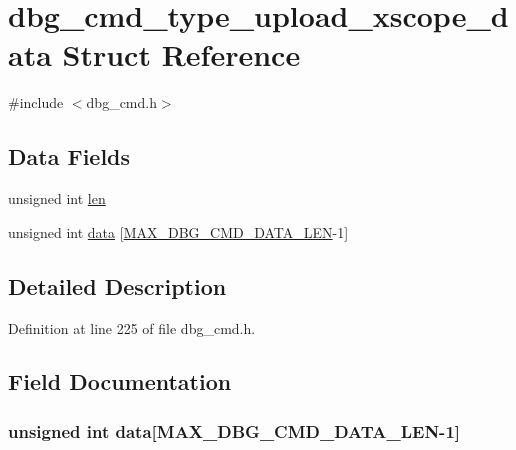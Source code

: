 \hypertarget{structdbg__cmd__type__upload__xscope__data}{\section{dbg\-\_\-cmd\-\_\-type\-\_\-upload\-\_\-xscope\-\_\-data Struct Reference}
\label{structdbg__cmd__type__upload__xscope__data}
}


{\ttfamily \#include $<$dbg\-\_\-cmd.\-h$>$}

\subsection*{Data Fields}
\begin{DoxyCompactItemize}
\item 
unsigned int \hyperlink{structdbg__cmd__type__upload__xscope__data_a77124bd5f7e31e6fffc19f335da0c23f}{len}
\item 
unsigned int \hyperlink{structdbg__cmd__type__upload__xscope__data_abceed6826af53b88f4cc936fac1716f0}{data} \mbox{[}\hyperlink{dbg__cmd_8h_a4552ec15033c8a68870cdf80eda5470c}{M\-A\-X\-\_\-\-D\-B\-G\-\_\-\-C\-M\-D\-\_\-\-D\-A\-T\-A\-\_\-\-L\-E\-N}-\/1\mbox{]}
\end{DoxyCompactItemize}


\subsection{Detailed Description}


Definition at line 225 of file dbg\-\_\-cmd.\-h.



\subsection{Field Documentation}
\hypertarget{structdbg__cmd__type__upload__xscope__data_abceed6826af53b88f4cc936fac1716f0}{
\subsubsection[{data}]{\setlength{\rightskip}{0pt plus 5cm}unsigned int data\mbox{[}{\bf M\-A\-X\-\_\-\-D\-B\-G\-\_\-\-C\-M\-D\-\_\-\-D\-A\-T\-A\-\_\-\-L\-E\-N}-\/1\mbox{]}}}\label{structdbg__cmd__type__upload__xscope__data_abceed6826af53b88f4cc936fac1716f0}


